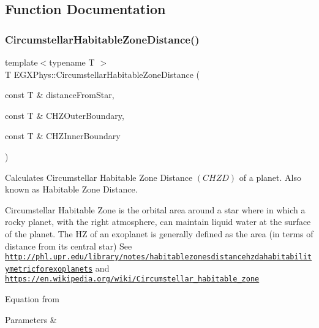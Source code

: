 \subsection{Function Documentation}
\mbox{\label{group___e_g_x_phys-_circumstellar_habitable_zone_limit_gacf3a720793cdb27f6d93b170b44e81be}} 
\subsubsection{\texorpdfstring{Circumstellar\+Habitable\+Zone\+Distance()}{CircumstellarHabitableZoneDistance()}}
{\footnotesize\ttfamily template$<$typename T $>$ \\
T E\+G\+X\+Phys\+::\+Circumstellar\+Habitable\+Zone\+Distance (\begin{DoxyParamCaption}\item[{const T \&}]{distance\+From\+Star,  }\item[{const T \&}]{C\+H\+Z\+Outer\+Boundary,  }\item[{const T \&}]{C\+H\+Z\+Inner\+Boundary }\end{DoxyParamCaption})}



Calculates Circumstellar Habitable Zone Distance $(CHZD)$ of a planet. Also known as Habitable Zone Distance. 

Circumstellar Habitable Zone is the orbital area around a star where in which a rocky planet, with the right atmosphere, can maintain liquid water at the surface of the planet. The HZ of an exoplanet is generally defined as the area (in terms of distance from its central star) See \href{http://phl.upr.edu/library/notes/habitablezonesdistancehzdahabitabilitymetricforexoplanets}{\tt http\+://phl.\+upr.\+edu/library/notes/habitablezonesdistancehzdahabitabilitymetricforexoplanets} and \href{https://en.wikipedia.org/wiki/Circumstellar_habitable_zone}{\tt https\+://en.\+wikipedia.\+org/wiki/\+Circumstellar\+\_\+habitable\+\_\+zone}

Equation from 
\begin{DoxyParams}{Parameters}
{\em } & \\
\hline
\end{DoxyParams}
\mbox{\label{group___e_g_x_phys-_circumstellar_habitable_zone_limit_ga9ee2e8023cb444aa4638c962788b5853}} 
